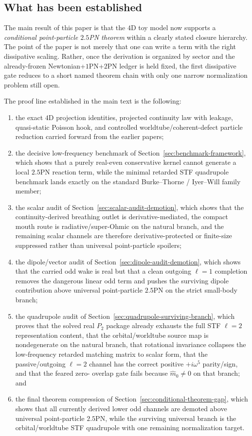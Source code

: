 \documentclass[11pt]{article}
\begin{document}
\subsection{What has been established}
\label{sec:conclusion-proven}

The main result of this paper is that the $4$D toy model now supports a
\emph{conditional point-particle $2.5$PN theorem} within a clearly stated
closure hierarchy.  The point of the paper is not merely that one can write a
term with the right dissipative scaling.  Rather, once the derivation is
organized by sector and the already-frozen Newtonian+$1$PN+$2$PN ledger is held
fixed, the first dissipative gate reduces to a short named theorem chain with
only one narrow normalization problem still open.

The proof line established in the main text is the following:
\begin{enumerate}
  \item the exact $4$D projection identities, projected continuity law with
  leakage, quasi-static Poisson hook, and controlled worldtube/coherent-defect
  particle reduction carried forward from the earlier papers;
  \item the decisive low-frequency benchmark of
  Section~\ref{sec:benchmark-framework}, which shows that a purely real-even
  conservative kernel cannot generate a local $2.5$PN reaction term, while the
  minimal retarded STF quadrupole benchmark lands exactly on the standard
  Burke--Thorne / Iyer--Will family member;
  \item the scalar audit of Section~\ref{sec:scalar-audit-demotion}, which
  shows that the continuity-derived breathing outlet is derivative-mediated, the
  compact mouth route is radiative/super-Ohmic on the natural branch, and the
  remaining scalar channels are therefore derivative-protected or finite-size
  suppressed rather than universal point-particle spoilers;
  \item the dipole/vector audit of Section~\ref{sec:dipole-audit-demotion},
  which shows that the carried odd wake is real but that a clean outgoing
  $\ell=1$ completion removes the dangerous linear odd term and pushes the
  surviving dipole contribution above universal point-particle $2.5$PN on the
  strict small-body branch;
  \item the quadrupole audit of
  Section~\ref{sec:quadrupole-surviving-branch}, which proves that the solved
  real $P_2$ package already exhausts the full STF $\ell=2$ representation
  content, that the orbital/worldtube source map is nondegenerate on the natural
  branch, that rotational invariance collapses the low-frequency retarded
  matching matrix to scalar form, that the passive/outgoing $\ell=2$ channel has
  the correct positive $+i\omega^5$ parity/sign, and that the feared zero-
  overlap gate fails because $\hat m_0\neq 0$ on that branch; and
  \item the final theorem compression of
  Section~\ref{sec:conditional-theorem-gap}, which shows that all currently
  derived lower odd channels are demoted above universal point-particle $2.5$PN,
  while the surviving universal branch is the orbital/worldtube STF quadrupole
  with one remaining normalization target.
\end{enumerate}
\end{document}
